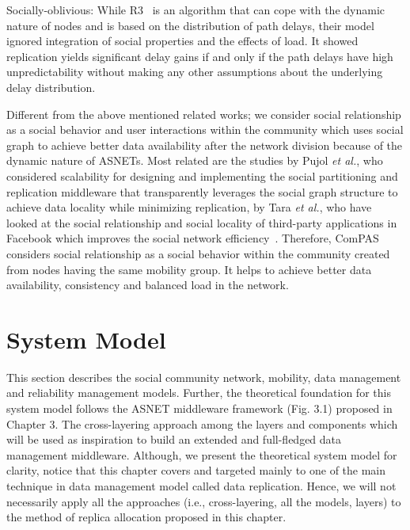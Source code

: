 Socially-oblivious: While R3~\cite{XTie2011} is an algorithm that can cope with the dynamic nature of nodes and is based on the distribution of path delays, their model ignored integration of social properties and the effects of load. It showed replication yields significant delay gains if and only if the path delays have high unpredictability without making any other assumptions about the underlying delay distribution.

Different from the above mentioned related works; we consider social relationship as a social behavior and user interactions within the community which uses social graph to achieve better data availability after the network division because of the dynamic nature of ASNETs. Most related are the studies by Pujol {\it et al.}, who considered scalability for designing and implementing the social partitioning and replication middleware that transparently leverages the social graph structure to achieve data locality while minimizing replication, by Tara {\it et al.}, who have looked at the social relationship and social locality of third-party applications in Facebook which improves the social network efficiency~\cite{Pujol2010}\cite{DTran2012}. Therefore, ComPAS considers social relationship as a social behavior within the community created from nodes having the same mobility group. It helps to achieve better data availability, consistency and balanced load in the network.

\section{System Model}\label{Chap4_03}
This section describes the social community network, mobility, data management and reliability management models. Further, the theoretical foundation for this system model follows the ASNET middleware framework (Fig. 3.1) proposed in Chapter 3.  The cross-layering approach among the layers and components which will be used as inspiration to build an extended and full-fledged data management middleware. Although, we present the theoretical system model for clarity, notice that this chapter covers and targeted mainly to one of the main technique in data management model called data replication. Hence, we will not necessarily apply all the approaches (i.e., cross-layering, all the models, layers) to the method of replica allocation proposed in this chapter.

